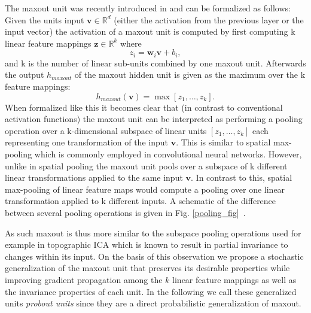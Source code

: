 \documentclass{article} \pdfoutput=1
\begin{document}
The maxout unit was recently introduced in \cite{Goodfellow2013} and can be
formalized as follows: Given the units input $\mathbf{v} \in
\mathbb{R}^d$ (either the activation from the previous
layer or the input vector) the activation of a maxout unit is
computed by first computing k linear
feature mappings $\mathbf{z} \in
\mathbb{R}^{k}$ where
\begin{equation}
  z_i = \mathbf{w}_i \mathbf{v} + b_i,
\end{equation}
and k is the number of linear sub-units combined by one maxout unit.
Afterwards the output $h_{maxout}$ of the maxout hidden unit is given
as the maximum over the k feature mappings:
\begin{equation}
  h_{maxout}(\mathbf{v}) = \max [z_1, \dots, z_k].
  \label{maxout_act}
\end{equation}
When formalized like this it becomes clear that (in contrast to
conventional activation functions) the maxout unit can be interpreted
as performing a pooling operation over a k-dimensional subspace of
linear units $[z_1, \dots, z_k]$ each representing one transformation
of the input $\mathbf{v}$. This is similar to spatial max-pooling
which is commonly employed in convolutional neural networks. However,
unlike in spatial pooling the maxout unit pools over a subspace of k
different linear transformations applied to the same input
$\mathbf{v}$. In contrast to this, spatial max-pooling of linear
feature maps would compute a pooling over one linear transformation
applied to k different inputs. A schematic of the difference between
several pooling operations is given in Fig. \ref{pooling_fig}~.

As such maxout is thus more similar to the subspace pooling operations
used for example in topographic ICA \cite{Hyvarinnen2009} which is
known to result in partial invariance to changes within its input. On the
basis of this observation we propose a stochastic generalization of
the maxout unit that preserves its desirable properties while
improving gradient propagation among the $k$ linear feature mappings
as well as the invariance properties of each unit. In the following we
call these generalized units \emph{probout units} since they are a
direct probabilistic generalization of maxout.
\end{document}
